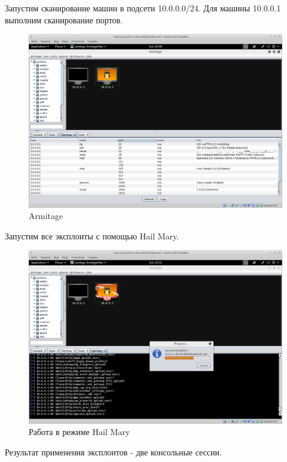 Запустим сканирование машин в подсети 10.0.0.0/24. Для машины 10.0.0.1 выполним сканирование портов.

\begin{figure}[H]
	\centering
	\includegraphics[width=\textwidth]{images/2.png}
	\caption{Armitage}
\end{figure}

Запустим все эксплоиты с помощью Hail Mary.

\begin{figure}[H]
	\centering
	\includegraphics[width=\textwidth]{images/3.png}
	\caption{Работа в режиме Hail Mary}
\end{figure}

Результат применения эксплоитов - две консольные сессии.

